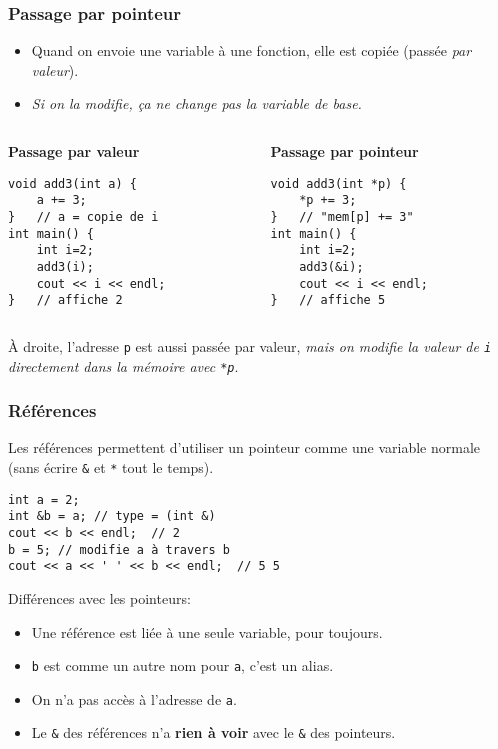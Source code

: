 \documentclass[12pt]{beamer}
\begin{document}
\begin{frame}[fragile]
\frametitle{Passage par pointeur}
\begin{itemize}
\item Quand on envoie une variable à une fonction, elle est copiée (passée \emph{par valeur}).
\item \emph{Si on la modifie, ça ne change pas la variable de base.}
\end{itemize}
\vspace{3pt}
\begin{columns}[T]
\begin{column}{.45\textwidth}
\textbf{Passage par valeur}
\begin{lstlisting}
void add3(int a) {
    a += 3;
}   // a = copie de i
int main() {
    int i=2;
    add3(i);
    cout << i << endl;
}   // affiche 2
\end{lstlisting}
\end{column}
\begin{column}{.45\textwidth}
\textbf{Passage par pointeur}
\begin{lstlisting}
void add3(int *p) {
    *p += 3;
}   // "mem[p] += 3"
int main() {
    int i=2;
    add3(&i);
    cout << i << endl;
}   // affiche 5
\end{lstlisting}
\end{column}
\end{columns}
\vspace{3pt}
À droite, l'adresse \lstinline|p| est aussi passée par valeur, \emph{mais on modifie la valeur de \lstinline|i| directement dans la mémoire avec \lstinline|*p|}.
\end{frame}

\begin{frame}[fragile]
\frametitle{Références}
Les références permettent d'utiliser un pointeur comme une variable normale (sans écrire \lstinline|&| et \lstinline|*| tout le temps).
\begin{lstlisting}
int a = 2;
int &b = a; // type = (int &)
cout << b << endl;  // 2
b = 5; // modifie a à travers b
cout << a << ' ' << b << endl;  // 5 5
\end{lstlisting}
Différences avec les pointeurs:
\begin{itemize}
\item Une référence est liée à une seule variable, pour toujours.
\item \lstinline|b| est comme un autre nom pour \lstinline|a|, c'est un alias.
\item On n'a pas accès à l'adresse de \lstinline|a|.
\item Le \lstinline|&| des références n'a \textbf{rien à voir} avec le \lstinline|&| des pointeurs.
\end{itemize}
\end{frame}
\end{document}
